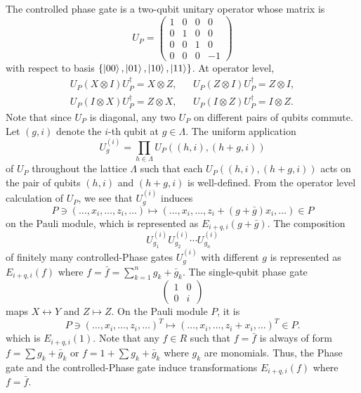 The controlled phase gate is a two-qubit unitary operator whose matrix is
\[
U_P =
 \begin{pmatrix}
  1 & 0 & 0 & 0 \\
  0 & 1 & 0 & 0 \\
  0 & 0 & 1 & 0 \\
  0 & 0 & 0 & -1
 \end{pmatrix}
\]
with respect to basis $\{ \left| {00} \right\rangle, \left| {01} \right\rangle, \left| {10} \right\rangle, \left| {11} \right\rangle \}$.
At operator level,
\begin{align*}
U_P (X \otimes I ) U_P^\dagger = X \otimes Z, & &
U_P (Z \otimes I ) U_P^\dagger = Z \otimes I, \\
U_P (I \otimes X ) U_P^\dagger = Z \otimes X, & &
U_P (I \otimes Z ) U_P^\dagger = I \otimes Z.
\end{align*}
Note that since $U_P$ is diagonal, any two $U_P$ on different pairs of qubits commute.
Let $(g,i)$ denote the $i$-th qubit at $g \in \Lambda$.
The uniform application
\[
U^{(i)}_g = \prod_{h \in \Lambda} U_P( (h,i), (h+g,i) )
\]
of $U_P$ throughout the lattice $\Lambda$
such that each $U_P( (h,i), (h+g,i) )$ acts on the pair of qubits $(h,i)$ and $(h+g,i)$
is well-defined. From the operator level calculation of $U_P$, we see that $U^{(i)}_g$
induces
\[
P \ni (\ldots,x_i,\ldots, z_i, \ldots) \mapsto ( \ldots, x_i,\ldots, z_i + (g+ \bar g)x_i, \ldots ) \in P
\]
on the Pauli module,
which is represented as $E_{i+q,i}(g+\bar g)$. 
The composition
\[
 U^{(i)}_{g_1} U^{(i)}_{g_2} \cdots U^{(i)}_{g_n}
\]
of finitely many controlled-Phase gates $U^{(i)}_g$ with different $g$
is represented as $E_{i+q,i}(f)$ where $f = \bar f = \sum_{k=1}^{n} g_k + \bar g_k$.
The single-qubit phase gate
\[
 \begin{pmatrix}
  1 & 0 \\
  0 & i
 \end{pmatrix}
\]
maps $X \leftrightarrow Y$ and $Z \mapsto Z$. On the Pauli module $P$, it is
\[
P \ni (\ldots,x_i,\ldots, z_i, \ldots)^T \mapsto ( \ldots, x_i,\ldots, z_i + x_i, \ldots )^T \in P .
\]
which is $E_{i+q,i}(1)$.
Note that any $f \in R$ such that $f = \bar f$ is always of form
$f = \sum g_k + \bar g_k$ or $f = 1 + \sum g_k + \bar g_k$
where $g_k$ are monomials.
Thus, the Phase gate and the controlled-Phase gate induce
transformations $E_{i+q,i}(f)$ where $f = \bar f$. 

